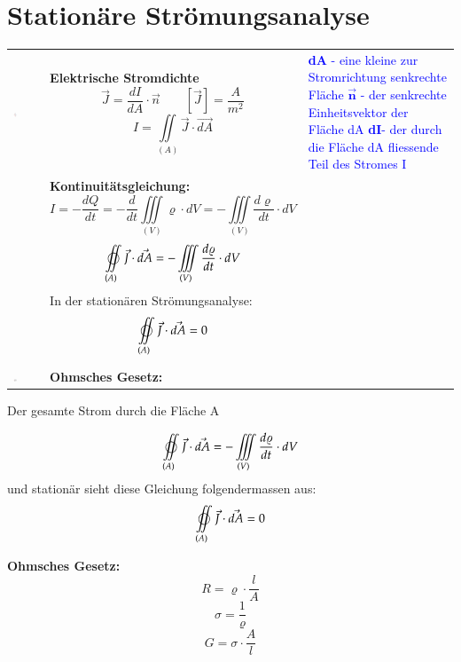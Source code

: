 \section{Stationäre Strömungsanalyse}

\begin{tabular}[h]{ C{.2\linewidth} P{.3\linewidth} P{.4\linewidth} }
	{\vspace{0pt}\includegraphics[width = 0.15\textwidth]{images/ElStromdichte}} & \textbf{Elektrische Stromdichte} \[ \vec{J} = \dfrac{dI}{dA}\cdot \vec{n}\qquad [\vec{J}] = \dfrac{A}{m^2} \] \[I = \iint\limits_{(A)}\vec{J}\cdot\vec{dA} \] & {\scriptsize \textcolor{blue}{\textbf{dA} - eine kleine zur Stromrichtung senkrechte Fläche \newline $\vec{\textbf{n}}$ - der senkrechte Einheitsvektor der Fläche dA \newline 
			\textbf{dI}- der durch die Fläche dA fliessende Teil des Stromes I}} \\
	& \textbf{Kontinuitätsgleichung:} \newline
	\[ I = -\dfrac{dQ}{dt} = -\dfrac{d}{dt}\iiint\limits_{(V)}\varrho\cdot dV = -\iiint\limits_{(V)}\dfrac{d\varrho}{dt}\cdot dV \] \newline \[ \varoiint\limits_{(A)}\vec{J}\cdot\vec{dA} = -\iiint\limits_{(V)}\dfrac{d\varrho}{dt}\cdot dV \] 
	{\scriptsize{In der stationären Strömungsanalyse:}} \newline 
	\[ \varoiint\limits_{(A)}\vec{J}\cdot\vec{dA} = 0\] & \\
	{\vspace{0pt}\includegraphics[width = 0.15\textwidth]{images/OhmschesGesetz}}& \textbf{Ohmsches Gesetz:} & \\
	
\end{tabular}

Der gesamte Strom durch die Fläche A




\[ \varoiint\limits_{(A)}\vec{J}\cdot\vec{dA} = -\iiint\limits_{(V)}\dfrac{d\varrho}{dt}\cdot dV \] 
und stationär sieht diese Gleichung folgendermassen aus:
\[ \varoiint\limits_{(A)}\vec{J}\cdot\vec{dA} = 0\]

\textbf{Ohmsches Gesetz:}
\[ R = \varrho\cdot\dfrac{l}{A}\]
\[ \sigma = \dfrac{1}{\varrho}\]
\[ G = \sigma\cdot\dfrac{A}{l} \]
\clearpage
\pagebreak